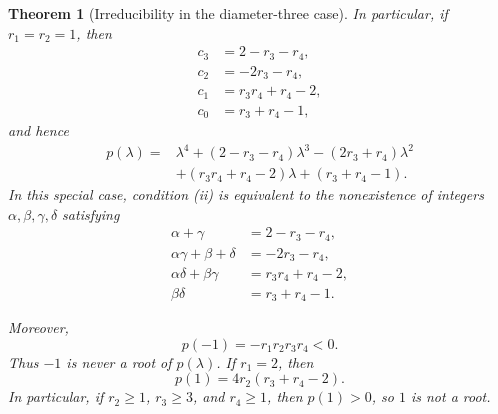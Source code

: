 \documentclass[11pt]{amsart}
\newtheorem{thm}{\bf Theorem}[section]
\begin{document}
\begin{thm}[Irreducibility in the diameter-three case]
In particular, if \(r_1=r_2=1\), then
\[
\begin{aligned}
c_3&=2-r_3-r_4,\\
c_2&=-2r_3-r_4,\\
c_1&=r_3r_4+r_4-2,\\
c_0&=r_3+r_4-1,
\end{aligned}
\]
and hence
\[
\begin{aligned}
p(\lambda)
={}&\lambda^4+(2-r_3-r_4)\lambda^3-(2r_3+r_4)\lambda^2\\
&+(r_3r_4+r_4-2)\lambda+(r_3+r_4-1).
\end{aligned}
\]
In this special case, condition \textup{(ii)} is equivalent to the nonexistence of integers \(\alpha,\beta,\gamma,\delta\) satisfying
\[
\begin{aligned}
\alpha+\gamma&=2-r_3-r_4,\\
\alpha\gamma+\beta+\delta&=-2r_3-r_4,\\
\alpha\delta+\beta\gamma&=r_3r_4+r_4-2,\\
\beta\delta&=r_3+r_4-1.
\end{aligned}
\]

Moreover,
\[
p(-1)=-r_1r_2r_3r_4<0.
\]
Thus \(-1\) is never a root of \(p(\lambda)\). If \(r_1=2\), then
\[
p(1)=4r_2(r_3+r_4-2).
\]
In particular, if \(r_2\geq 1\), \(r_3\geq 3\), and \(r_4\geq 1\), then \(p(1)>0\), so \(1\) is not a root.
\end{thm}
\end{document}
